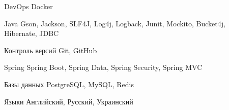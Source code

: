 

\begin{cvskills}

  \cvskill
    {DevOps} %
    {Docker} %

  \cvskill
    {Java} %
    {Gson, Jackson, SLF4J, Log4j, Logback, Junit, Mockito, Bucket4j, Hibernate, JDBC} %

  \cvskill
    {Контроль версий} %
    {Git, GitHub}

  \cvskill
    {Spring} %
    {Spring Boot, Spring Data, Spring Security, Spring MVC} %

  \cvskill
    {Базы данных} %
    {PostgreSQL, MySQL, Redis} %

  \cvskill
    {Языки} %
    {Английский, Русский, Украинский} %

\end{cvskills}
